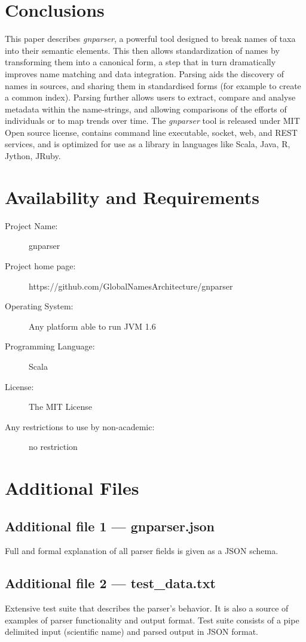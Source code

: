 \documentclass{bmcart}
\begin{document}
\section*{Conclusions}

This paper describes  \textit{gnparser}, a powerful tool designed to break
names of taxa into their semantic elements.  This then allows standardization
of names by transforming them into a canonical form, a step that in turn
dramatically improves name matching and data integration. Parsing aids the
discovery of names in sources, and sharing them in standardised forms (for
example to create a common index).  Parsing further allows users to extract,
compare and analyse metadata within the name-strings, and allowing comparisons
of the efforts of individuals or to map trends over time. The \textit{gnparser}
tool is released under MIT Open source license, contains command line
executable, socket, web, and REST services, and is optimized for use as a
library in languages like Scala, Java, R, Jython, JRuby.

\section*{Availability and Requirements}

\begin{description}
  \item[Project Name:] gnparser
  \item[Project home page:] https://github.com/GlobalNamesArchitecture/gnparser
  \item[Operating System:] Any platform able to run JVM 1.6
  \item[Programming Language:] Scala
  \item[License:] The MIT License
  \item[Any restrictions to use by non-academic:] no restriction
\end{description}

\section*{Additional Files}

  \subsection*{Additional file 1 --- gnparser.json}
  Full and formal explanation of all parser fields is given as a JSON schema.

  \subsection*{Additional file 2 --- test\_data.txt}
  Extensive test suite that describes the parser's behavior. It is also a
  source of examples of parser functionality and output format.
  Test suite consists of a pipe delimited input (scientific name) and parsed
  output in JSON format.
\end{document}
